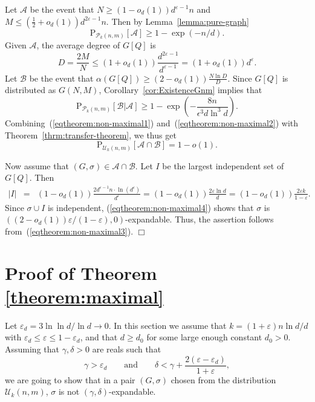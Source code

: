 \documentclass[a4paper,10pt]{article}
\newcommand{\qed}{\hfill$\Box$\smallskip}
\newcommand\cA{\mathcal{A}}
\newcommand\cB{\mathcal{B}}
\newcommand\cU{\mathcal{U}}
\newcommand\cP{\mathcal{P}}
\newcommand\eps{\varepsilon}
\newcommand\pr{\mathrm{P}}
\newcommand\ra{\rightarrow}
\newcommand\brk[1]{\left\lbrack{#1}\right\rbrack}
\newcommand\abs[1]{\left|{#1}\right|}
\newcommand\Lem{Lemma}
\newcommand\Thm{Theorem}
\newcommand\Cor{Corollary}
\begin{document}
Let $\cA$ be the event that $N\geq(1-o_d(1))d^{\eps-1}n$ and
$M\leq (\frac12+o_d(1))d^{2\eps-1}n$. Then by \Lem~\ref{lemma:pure-graph}
\begin{equation}\label{eqtheorem:non-maximal1}
	\pr_{\cP_k(n,m)}\brk{\cA}\geq1-\exp(-n/d).
\end{equation}
Given $\cA$, the average degree of $G\brk Q$ is
$$D=\frac{2M}N\leq(1+o_d(1))\frac{d^{2\eps-1}}{d^{\eps-1}}=(1+o_d(1))d^{\eps}.$$
Let $\cB$ be the event that $\alpha(G\brk Q)\geq(2-o_d(1))\frac{N\ln D}{D}$.
Since $G\brk Q$ is distributed as $G(N,M)$, \Cor~\ref{cor:ExistenceGnm} 
implies that
\begin{equation}\label{eqtheorem:non-maximal2}
	\pr_{\cP_k(n,m)}\brk{\cB|\cA}\geq1-\exp\left(-\frac{8n}{\epsilon^3 d \ln^3 d}\right).
\end{equation}
Combining~(\ref{eqtheorem:non-maximal1}) and~(\ref{eqtheorem:non-maximal2}) with \Thm~\ref{thrm:transfer-theorem}, we thus get
	\begin{equation}\label{eqtheorem:non-maximal3}
	\pr_{\cU_k(n,m)}\brk{\cA\cap \cB}=1-o(1).
	\end{equation}

\noindent
Now assume that $(G,\sigma)\in\cA\cap\cB$.
Let $I$ be the largest independent set of $G\brk Q$.
Then
	\begin{eqnarray}\label{eqtheorem:non-maximal4}
	\abs I&=&(1-o_d(1))\frac{2d^{\eps-1}n\cdot\ln(d^{\eps})}{d^{\eps}}=(1-o_d(1))\frac{2\eps\ln d}d=(1-o_d(1))\frac{2\eps k}{1-\eps}.
	\end{eqnarray}
Since $\sigma\cup I$ is independent, (\ref{eqtheorem:non-maximal4}) shows that $\sigma$ is
	$((2-o_d(1))\eps/(1-\eps),0)$-expandable.
Thus, the assertion follows from~(\ref{eqtheorem:non-maximal3}).
\qed





\section{Proof of Theorem \ref{theorem:maximal}}\label{section:theorem:maximal}



Let $\eps_d=3\ln\ln d/\ln d\ra0$.
In this section we assume that $k=(1+\eps)n\ln d/d$ with $\eps_d\leq \eps\leq1-\eps_d$,
	and that $d\geq d_0$ for some large enough constant $d_0>0$.
Assuming that $\gamma,\delta>0$ are reals such that
	\begin{equation}\label{eqsection:theorem:maximal}
	\gamma>\eps_d\qquad\mbox{and}\qquad\delta<\gamma+\frac{2(\eps-\eps_d)}{1+\eps},
	\end{equation}
we are going to show that in a pair $(G,\sigma)$ chosen from the distribution $\cU_k(n,m)$,
$\sigma$ is not $(\gamma,\delta)$-expandable.
\end{document}
